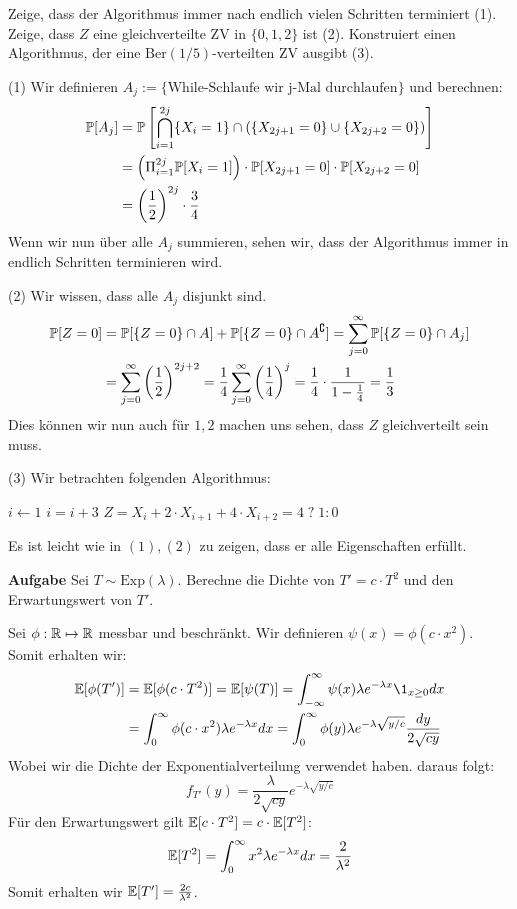 Zeige, dass der Algorithmus immer nach endlich vielen Schritten terminiert (1). Zeige, dass $Z$ eine gleichverteilte ZV in $\{0,1,2\}$ ist (2). Konstruiert einen Algorithmus, der eine $\text{Ber}(1/5)$-verteilten ZV ausgibt (3). \medskip

(1) Wir definieren $A_j := \{ \text{While-Schlaufe wir j-Mal durchlaufen} \}$ und berechnen:
\begin{align*}
	\mathbb{P}[A_j] &= \mathbb{P} \left[ \bigcap_{i=1}^{2j} \{X_i = 1\} \cap (\{X_{2j+1} = 0\} \cup \{X_{2j+2} = 0\}) \right] \\
	&= \left( \Pi_{i=1}^{2j} \mathbb{P}[X_i = 1] \right) \cdot \mathbb{P}[X_{2j+1} = 0] \cdot \mathbb{P}[X_{2j+2} = 0] \\
	&= \left(\frac{1}{2}\right)^{2j} \cdot \frac{3}{4}
\end{align*}
Wenn wir nun über alle $A_j$ summieren, sehen wir, dass der Algorithmus immer in endlich Schritten terminieren wird. \medskip

(2) Wir wissen, dass alle $A_j$ disjunkt sind.
\begin{align*}
	\mathbb{P}[Z=0] &= \mathbb{P}[\{Z=0\} \cap A] + \mathbb{P}[\{Z=0\} \cap A^\complement] = \sum\limits_{j=0}^\infty \mathbb{P}[\{Z=0\} \cap A_j] \\
	&= \sum\limits_{j=0}^\infty \left(\frac{1}{2}\right)^{2j + 2} = \frac{1}{4}\sum\limits_{j=0}^\infty \left(\frac{1}{4}\right)^{j} = \frac{1}{4} \cdot \frac{1}{1 - \frac{1}{4}} = \frac{1}{3}
\end{align*}
Dies können wir nun auch für $1,2$ machen uns sehen, dass $Z$ gleichverteilt sein muss.

(3) Wir betrachten folgenden Algorithmus:
\begin{algorithmic}
	\State $i \gets 1$
		\State $i = i + 3$
	\EndWhile
	\State \Return $Z = X_i + 2 \cdot X_{i+1} + 4 \cdot X_{i+2} = 4 \; ? \; 1 : 0$
\end{algorithmic}
Es ist leicht wie in $(1), (2)$ zu zeigen, dass er alle Eigenschaften erfüllt.

\hrulefill

\textbf{Aufgabe}
Sei $T \sim \text{Exp}(\lambda)$. Berechne die Dichte von $T' = c \cdot T^2$ und den Erwartungswert von $T'$. \medskip

Sei $\phi: \mathbb{R} \mapsto \mathbb{R}$ messbar und beschränkt. Wir definieren $\psi(x) = \phi(c \cdot x^2)$. Somit erhalten wir:
\begin{align*}
	\E[\phi(T')] &= \E[\phi(c \cdot T^2)] = \E[\psi(T)] = \int_{-\infty}^\infty \psi(x) \lambda e^{-\lambda x}\1_{x \geq 0}dx \\
	&= \int_0^\infty \phi(c \cdot x^2) \lambda e^{-\lambda x}dx = \int_0^\infty \phi(y) \lambda e^{-\lambda \sqrt{y / c}} \frac{dy}{2 \sqrt{cy}} \\
\end{align*}
Wobei wir die Dichte der Exponentialverteilung verwendet haben. daraus folgt:
$$f_{T'}(y) = \frac{\lambda}{2 \sqrt{cy}} e^{-\lambda \sqrt{y / c}}$$
Für den Erwartungswert gilt $\mathbb{E}[c \cdot T^2] = c \cdot \mathbb{E}[T^2]$:
$$\mathbb{E}[T^2] = \int_{0}^\infty x^2 \lambda e^{-\lambda x}dx = \frac{2}{\lambda^2}$$
Somit erhalten wir $\mathbb{E}[T'] = \frac{2c}{\lambda^2}$.

